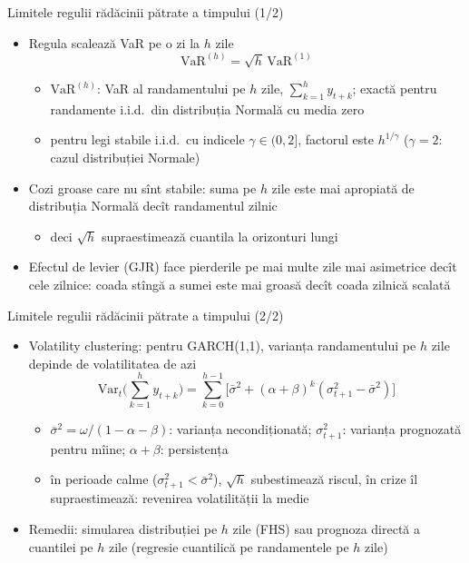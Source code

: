 \begin{frame}{Limitele regulii rădăcinii pătrate a timpului (1/2)}
\itemsize{\small}
\begin{itemize}
    \item Regula scalează VaR pe o zi la $h$ zile
    \[ \mathrm{VaR}^{(h)} = \sqrt h\,\mathrm{VaR}^{(1)} \]
    \begin{itemize}
        \item $\mathrm{VaR}^{(h)}$: VaR al randamentului pe $h$ zile, $\sum_{k=1}^h y_{t+k}$; exactă pentru randamente i.i.d.\ din distribuția Normală cu media zero
        \item pentru legi stabile i.i.d.\ cu indicele $\gamma \in (0, 2]$, factorul este $h^{1/\gamma}$ ($\gamma = 2$: cazul distribuției Normale)
    \end{itemize}
    \item Cozi groase care nu sînt stabile: suma pe $h$ zile este mai apropiată de distribuția Normală decît randamentul zilnic
    \begin{itemize}
        \item deci $\sqrt h$ supraestimează cuantila la orizonturi lungi 
    \end{itemize}
    \item Efectul de levier (GJR) face pierderile pe mai multe zile mai asimetrice decît cele zilnice: coada stîngă a sumei este mai groasă decît coada zilnică scalată
\end{itemize}
\end{frame}

\begin{frame}{Limitele regulii rădăcinii pătrate a timpului (2/2)}
\itemsize{\small}
\begin{itemize}
    \item Volatility clustering: pentru GARCH(1,1), varianța randamentului pe $h$ zile depinde de volatilitatea de azi
    \[ \mathrm{Var}_t\Big(\sum_{k=1}^h y_{t+k}\Big) = \sum_{k=0}^{h-1}\big[\bar\sigma^2 + (\alpha + \beta)^k(\sigma_{t+1}^2 - \bar\sigma^2)\big] \]
    \begin{itemize}
        \item $\bar\sigma^2 = \omega/(1 - \alpha - \beta)$: varianța necondiționată; $\sigma^2_{t+1}$: varianța prognozată pentru mîine; $\alpha + \beta$: persistența
        \item în perioade calme ($\sigma^2_{t+1} < \bar\sigma^2$), $\sqrt h$ subestimează riscul, în crize îl supraestimează: revenirea volatilității la medie
    \end{itemize}
    \item Remedii: simularea distribuției pe $h$ zile (FHS) sau prognoza directă a cuantilei pe $h$ zile (regresie cuantilică pe randamentele pe $h$ zile)
\end{itemize}
\end{frame}

